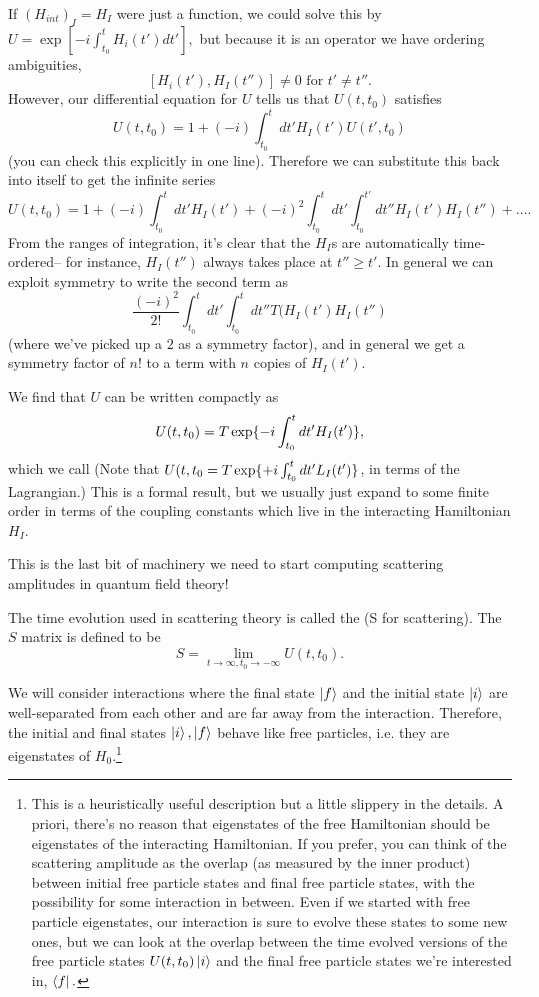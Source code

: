 If $(H_{int})_I=H_I$ were just a function, we could solve this by $U=\exp[-i \int_{t_0}^t H_i(t')dt'],$ but because it is an operator we have ordering ambiguities,
$$[H_i(t'),H_I(t'')]\neq 0 \text{ for }t'\neq t''.$$
However, our differential equation for $U$ tells us that $U(t,t_0)$ satisfies
$$U(t,t_0)=1+(-i)\int_{t_0}^t dt' H_I(t')U(t',t_0)$$
(you can check this explicitly in one line). Therefore we can substitute this back into itself to get the infinite series
$$U(t,t_0)=1+(-i)\int_{t_0}^t dt' H_I(t')+(-i)^2 \int_{t_0}^t dt' \int_{t_0}^{t'} dt'' H_I(t')H_I(t'')+\ldots.$$
From the ranges of integration, it's clear that the $H_I$s are automatically time-ordered-- for instance, $H_I(t'')$ always takes place at $t''\geq t'$. In general we can exploit symmetry to write the second term as
$$\frac{(-i)^2}{2!}\int_{t_0}^t dt' \int_{t_0}^t dt'' T(H_I(t')H_I(t'')$$ (where we've picked up a $2$ as a symmetry factor), and in general we get a symmetry factor of $n!$ to a term with $n$ copies of $H_I(t')$.
\begin{defn}
We find that $U$ can be written compactly as
$$U(t,t_0)=T \exp \{-i\int_{t_0}^t dt' H_I(t')\},$$
which we call  (Note that $U(t,t_0=T \exp \{+i\int_{t_0}^t dt' L_I(t')\}$, in terms of the Lagrangian.) This is a formal result, but we usually just expand to some finite order in terms of the coupling constants which live in the interacting Hamiltonian $H_I$.
\end{defn}
This is the last bit of machinery we need to start computing scattering amplitudes in quantum field theory!

\begin{defn}
The time evolution used in scattering theory is called the  (S for scattering). The $S$ matrix is defined to be
$$S=\lim_{t\to \infty,t_0\to -\infty}U(t,t_0).$$
\end{defn}
We will consider interactions where the final state $\left| f \right>$ and the initial state $\left| i \right>$ are well-separated from each other and are far away from the interaction. Therefore, the initial and final states $\left| i \right>,\left| f \right>$ behave like free particles, i.e. they are eigenstates of $H_0$.\footnote{This is a heuristically useful description but a little slippery in the details. A  priori, there's no reason that eigenstates of the free Hamiltonian should be eigenstates of the interacting Hamiltonian. If you prefer, you can think of the scattering amplitude as the overlap (as measured by the inner product) between initial free particle states and final free particle states, with the possibility for some interaction in between. Even if we started with free particle eigenstates, our interaction is sure to evolve these states to some new ones, but we can look at the overlap between the time evolved versions of the free particle states $U(t,t_0)\left| i \right>$ and the final free particle states we're interested in, $\left< f \right|.$}

